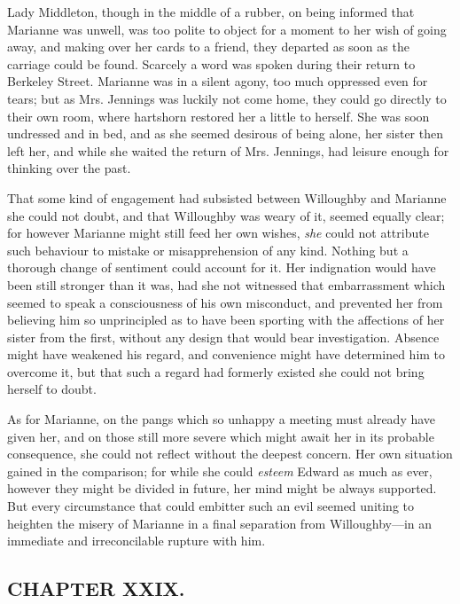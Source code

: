 Lady Middleton, though in the middle of a rubber, on being informed that Marianne was unwell, was too polite to object for a moment to her wish of going away, and making over her cards to a friend, they departed as soon as the carriage could be found. Scarcely a word was spoken during their return to Berkeley Street. Marianne was in a silent agony, too much oppressed even for tears; but as Mrs. Jennings was luckily not come home, they could go directly to their own room, where hartshorn restored her a little to herself. She was soon undressed and in bed, and as she seemed desirous of being alone, her sister then left her, and while she waited the return of Mrs. Jennings, had leisure enough for thinking over the past.

That some kind of engagement had subsisted between Willoughby and Marianne she could not doubt, and that Willoughby was weary of it, seemed equally clear; for however Marianne might still feed her own wishes, {\em she} could not attribute such behaviour to mistake or misapprehension of any kind. Nothing but a thorough change of sentiment could account for it. Her indignation would have been still stronger than it was, had she not witnessed that embarrassment which seemed to speak a consciousness of his own misconduct, and prevented her from believing him so unprincipled as to have been sporting with the affections of her sister from the first, without any design that would bear investigation. Absence might have weakened his regard, and convenience might have determined him to overcome it, but that such a regard had formerly existed she could not bring herself to doubt.

As for Marianne, on the pangs which so unhappy a meeting must already have given her, and on those still more severe which might await her in its probable consequence, she could not reflect without the deepest concern. Her own situation gained in the comparison; for while she could {\em esteem} Edward as much as ever, however they might be divided in future, her mind might be always supported. But every circumstance that could embitter such an evil seemed uniting to heighten the misery of Marianne in a final separation from Willoughby---in an immediate and irreconcilable rupture with him.

\subsection[chapter-xxix.]{\useURL[url29][][][]\from[url29]CHAPTER XXIX.}

